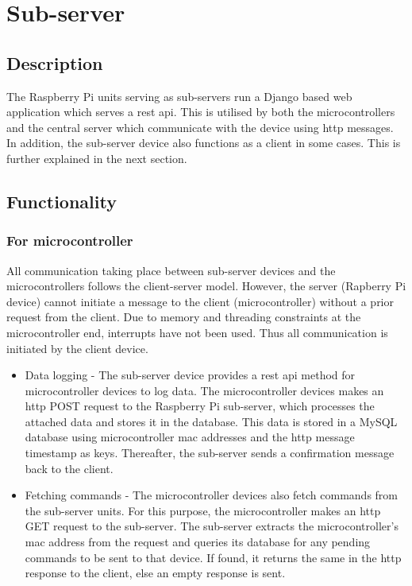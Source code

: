 \documentclass[letterpaper,11pt]{report}
\begin{document}
\section{Sub-server}
\subsection{Description}
The Raspberry Pi units serving as sub-servers run a Django based web application which serves a \ac{rest} \ac{api}. This is utilised by both the microcontrollers and the central server which communicate with the device using \ac{http} messages. In addition, the sub-server device also functions as a client in some cases. This is further explained in the next section.
\subsection{Functionality}
\subsubsection{For microcontroller}
All communication taking place between sub-server devices and the microcontrollers follows the client-server model. However, the server (Rapberry Pi device) cannot initiate a message to the client (microcontroller) without a prior request from the client. Due to memory and threading constraints at the microcontroller end, interrupts have not been used. Thus all communication is initiated by the client device. 
\begin{itemize}
    \item Data logging - The sub-server device provides a \ac{rest} \ac{api} method for microcontroller devices to log data. The microcontroller devices makes an \ac{http} POST request to the Raspberry Pi sub-server, which processes the attached data and stores it in the database. This data is stored in a MySQL database using microcontroller \ac{mac} addresses and the \ac{http} message timestamp as keys. Thereafter, the sub-server sends a confirmation message back to the client.
    \item Fetching commands - The microcontroller devices also fetch commands from the sub-server units. For this purpose, the microcontroller makes an \ac{http} GET request to the sub-server. The sub-server extracts the microcontroller's \ac{mac} address from the request and queries its database for any pending commands to be sent to that device. If found, it returns the same in the \ac{http} response to the client, else an empty response is sent.
\end{itemize}
\end{document}
